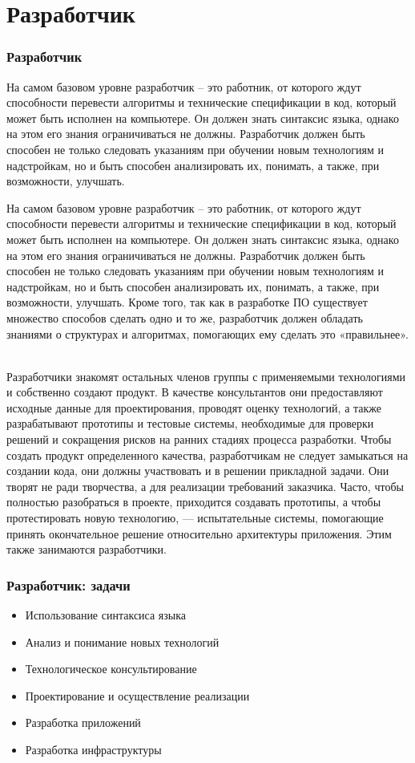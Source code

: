 \documentclass{../industrial-development}
\begin{document}
\section{Разработчик }
\begin{frame} \frametitle{Разработчик}
	\begin{block}{}
		\alert {}На самом базовом уровне разработчик – это работник, от которого ждут способности перевести алгоритмы и технические спецификации в код, который может быть исполнен на компьютере. Он должен знать синтаксис языка, однако на этом его знания ограничиваться не должны. Разработчик должен быть способен не только следовать указаниям при обучении новым технологиям и надстройкам, но и быть способен анализировать их, понимать, а также, при возможности, улучшать.
	\end{block}
\end{frame}
\lecturenotes

На самом базовом уровне разработчик – это работник, от которого ждут способности перевести алгоритмы и технические спецификации в код, который может быть исполнен на компьютере. Он должен знать синтаксис языка, однако на этом его знания ограничиваться не должны. Разработчик должен быть способен не только следовать указаниям при обучении новым технологиям и надстройкам, но и быть способен анализировать их, понимать, а также, при возможности, улучшать. Кроме того, так как в разработке ПО существует множество способов сделать одно и то же, разработчик должен обладать знаниями о структурах и алгоритмах, помогающих ему сделать это «правильнее».   ~\cite{Anatomy}

Разработчики знакомят остальных членов группы с применяемыми технологиями и собственно создают продукт. В качестве консультантов они предоставляют исходные данные для проектирования, проводят оценку технологий, а также разрабатывают прототипы и тестовые системы, необходимые для проверки решений и сокращения рисков на ранних стадиях процесса разработки. Чтобы создать продукт определенного качества, разработчикам не следует замыкаться на создании кода, они должны участвовать и в решении прикладной задачи. Они творят не ради творчества, а для реализации требований за­казчика. Часто, чтобы полностью разобраться в проекте, приходится создавать прототипы, а чтобы протестировать новую технологию, — испытательные системы, помогающие принять окончательное решение относительно архитектуры приложения. Этим также занимаются разработчики. ~\cite{Collective}
\begin{frame} \frametitle{Разработчик: задачи}
  \begin{itemize}
  \item Использование синтаксиса языка
  \item Анализ и понимание новых технологий
  \item Технологическое консультирование
\item Проектирование и осуществление реализации
\item Разработка приложений
\item Разработка инфраструктуры
  \end{itemize}
\end{frame}
\end{document}
